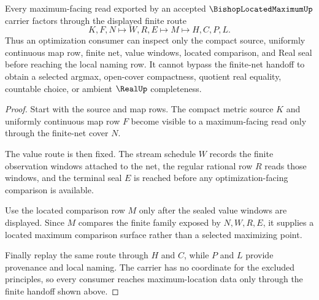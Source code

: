 \begin{theorem}
\label{thm:bishop-located-maximum-finite-net-handoff}
Every maximum-facing read exported by an accepted $\BishopLocatedMaximumUp$ carrier factors through the displayed finite route
$$
K,F,N \longmapsto W,R,E \longmapsto M \longmapsto H,C,P,L .
$$
Thus an optimization consumer can inspect only the compact source, uniformly continuous map row, finite net, value windows, located comparison, and Real seal before reaching the local naming row. It cannot bypass the finite-net handoff to obtain a selected argmax, open-cover compactness, quotient real equality, countable choice, or ambient $\RealUp$ completeness.
\end{theorem}
\begin{proof}
Start with the source and map rows. The compact metric source $K$ and uniformly continuous map row $F$ become visible to a maximum-facing read only through the finite-net cover $N$.

The value route is then fixed. The stream schedule $W$ records the finite observation windows attached to the net, the regular rational row $R$ reads those windows, and the terminal seal $E$ is reached before any optimization-facing comparison is available.

Use the located comparison row $M$ only after the sealed value windows are displayed. Since $M$ compares the finite family exposed by $N,W,R,E$, it supplies a located maximum comparison surface rather than a selected maximizing point.

Finally replay the same route through $H$ and $C$, while $P$ and $L$ provide provenance and local naming. The carrier has no coordinate for the excluded principles, so every consumer reaches maximum-location data only through the finite handoff shown above.
\end{proof}


